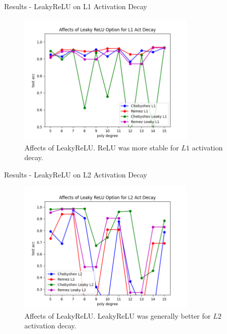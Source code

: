 \documentclass[9pt]{beamer}
\begin{document}
\begin{frame}{Results - LeakyReLU on L1 Activation Decay}
    \begin{figure}[!h]
        \centering
        \includegraphics[width=0.75\textwidth]{resource/leaky.png}
        \caption{Affects of LeakyReLU. ReLU was more stable for $L1$ activation decay.}
        \label{fig:affects_leaky_l1}
    \end{figure}
\end{frame}

\begin{frame}{Results - LeakyReLU on L2 Activation Decay}
    \begin{figure}[!h]
        \centering
        \includegraphics[width=0.75\textwidth]{resource/leaky_l2.png}
        \caption{Affects of LeakyReLU. LeakyReLU was generally better for $L2$ activation decay.}
        \label{fig:affects_leaky_l2}
    \end{figure}
\end{frame}
\end{document}
